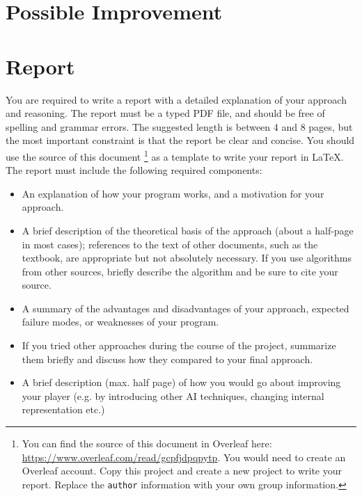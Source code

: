 \documentclass[twoside,11pt]{article}
\begin{document}
\section{Possible Improvement}

\section{Report}

You are required to write a report with a detailed explanation of your approach and reasoning. The report must be a typed PDF file, and should be free of spelling and grammar errors. The suggested length is between 4 and 8 pages, but the most important constraint is that the report be clear and concise. You should use the source of this document \footnote{You can find the source of this document in Overleaf here: \href{https://www.overleaf.com/read/gcpfjdpqpytp}{https://www.overleaf.com/read/gcpfjdpqpytp}. You would need to create an Overleaf account. Copy this project and create a new project to write your report. Replace the \texttt{author} information with your own group information.} as a template to write your report in \LaTeX.  The report must include the following required components:

\begin{itemize}
    \item An explanation of how your program works, and a motivation for your approach.
    \item A brief description of the theoretical basis of the approach (about a half-page in most cases); references to the text of other documents, such as the textbook, are appropriate but not absolutely necessary. If you use algorithms from other sources, briefly describe the algorithm and be sure to cite your source.
    \item A summary of the advantages and disadvantages of your approach, expected failure modes, or weaknesses of your program.
    \item If you tried other approaches during the course of the project, summarize them briefly and discuss how they compared to your final approach.
    \item A brief description (max. half page) of how you would go about improving your player (e.g. by introducing other AI techniques, changing internal representation etc.)
    
\end{itemize}

% 
\end{document}
